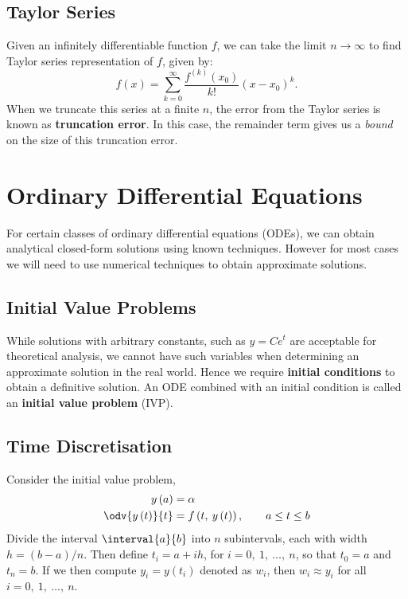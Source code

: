 \documentclass{article}
\begin{document}
\subsection{Taylor Series}
Given an infinitely differentiable function \(f\), we can take the limit \(n \to \infty\) to find Taylor series representation of \(f\), given by:
\begin{equation*}
    f\left( x \right) = \sum_{k = 0}^\infty \frac{f^{\left( k \right)}\left( x_0 \right)}{k!} \left( x - x_0 \right)^k.
\end{equation*}
When we truncate this series at a finite \(n\), the error from the Taylor series is known as \textbf{truncation error}. In this case,
the remainder term gives us a \textit{bound} on the size of this truncation error.
\section{Ordinary Differential Equations}
For certain classes of ordinary differential equations (ODEs), we can obtain analytical closed-form solutions using known techniques.
However for most cases we will need to use numerical techniques to obtain approximate solutions.
\subsection{Initial Value Problems}
While solutions with arbitrary constants, such as \(y = C e^{t}\) are acceptable for theoretical analysis,
we cannot have such variables when determining an approximate solution in the real world.
Hence we require \textbf{initial conditions} to obtain a definitive solution. An ODE combined
with an initial condition is called an \textbf{initial value problem} (IVP).
\subsection{Time Discretisation}
Consider the initial value problem,
\begin{align*}
    y\left( a \right)          & = \alpha                                                              \\
    \odv{y\left( t \right)}{t} & = f\left( t,\: y\left( t \right) \right), \quad \quad a \leq t \leq b
\end{align*}
Divide the interval \(\interval{a}{b}\) into \(n\) subintervals, each with width \(h = \left( b - a \right) / n\).
Then define \(t_i = a + i h\), for \(i = 0,\: 1,\: \ldots,\: n\), so that \(t_0 = a\) and \(t_n = b\). If we then compute
\(y_i = y\left( t_i \right)\) denoted as \(w_i\), then \(w_i \approx y_i\) for all \(i = 0,\: 1,\: \ldots,\: n\).
\end{document}
